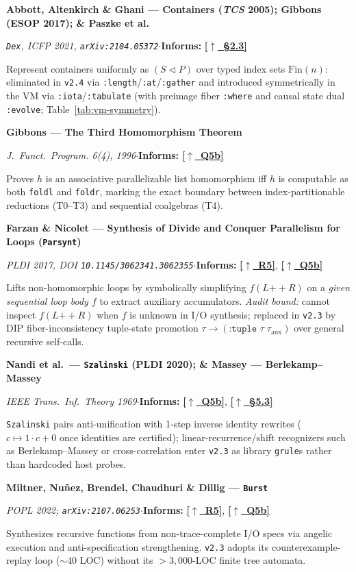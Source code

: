 \documentclass[12pt]{article}
\newcommand{\secback}[2]{\hyperref[#1]{\textcolor{linkblue}{\textbf{\small[\(\uparrow\)~#2]}}}}
\newcommand{\litentry}[4]{%
  \par\medskip\noindent\hypertarget{lit:#1}{}%
  \textbf{#2}\par\nopagebreak\noindent
  {\footnotesize\textit{#3}\quad$\cdot$\quad\textbf{Informs:} #4}\par\nopagebreak\smallskip\noindent\ignorespaces
}
\begin{document}
\litentry{abbott2005}{Abbott, Altenkirch \& Ghani --- Containers (\emph{TCS} 2005); \hypertarget{lit:gibbons2017}{}Gibbons (ESOP 2017); \& \hypertarget{lit:paszke2021}{}Paszke et al.}{\texttt{Dex}, ICFP 2021, \texttt{arXiv:2104.05372}}{\secback{sec:audit-index}{\S2.3}}
Represent containers uniformly as $(S \triangleleft P)$ over typed index sets $\mathrm{Fin}(n)$: eliminated in \texttt{v2.4} via \texttt{:length}/\texttt{:at}/\texttt{:gather} and introduced symmetrically in the VM via \texttt{:iota}/\texttt{:tabulate} (with preimage fiber \texttt{:where} and causal state dual \texttt{:evolve}; Table~\ref{tab:vm-symmetry}).

\litentry{gibbons1996}{Gibbons --- The Third Homomorphism Theorem}{\emph{J.\ Funct.\ Program.} 6(4), 1996}{\secback{ans:5b}{Q5b}}
Proves $h$ is an associative parallelizable list homomorphism iff $h$ is computable as both \texttt{foldl} and \texttt{foldr}, marking the exact boundary between index-partitionable reductions (T0--T3) and sequential coalgebras (T4).

\litentry{farzan2017}{Farzan \& Nicolet --- Synthesis of Divide and Conquer Parallelism for Loops (\texttt{Parsynt})}{PLDI 2017, DOI \texttt{10.1145/3062341.3062355}}{\secback{sec:thesis}{R5}, \secback{ans:5b}{Q5b}}
Lifts non-homomorphic loops by symbolically simplifying $f(L \mathbin{+\!\!+} R)$ on a \emph{given sequential loop body $f$} to extract auxiliary accumulators. \emph{Audit bound:} cannot inspect $f(L\mathbin{+\!\!+}R)$ when $f$ is unknown in I/O synthesis; replaced in \texttt{v2.3} by DIP fiber-inconsistency tuple-state promotion $\tau \to (\texttt{:tuple }\tau\;\tau_{\mathrm{aux}})$ over general recursive self-calls.

\litentry{nandi2020}{Nandi et al.\ --- \texttt{Szalinski} (PLDI 2020); \& \hypertarget{lit:berlekamp1969}{}Massey --- Berlekamp--Massey}{IEEE Trans.\ Inf.\ Theory 1969}{\secback{ans:5b}{Q5b}, \secback{sec:arch-geom}{\S5.3}}
\texttt{Szalinski} pairs anti-unification with 1-step inverse identity rewrites ($c \mapsto 1\cdot c + 0$ once identities are certified); linear-recurrence/shift recognizers such as Berlekamp--Massey or cross-correlation enter \texttt{v2.3} as library \texttt{grule}s rather than hardcoded host probes.

\litentry{miltner2022}{Miltner, Nu\~nez, Brendel, Chaudhuri \& Dillig --- \texttt{Burst}}{POPL 2022; \texttt{arXiv:2107.06253}}{\secback{sec:thesis}{R5}, \secback{ans:5b}{Q5b}}
Synthesizes recursive functions from non-trace-complete I/O specs via angelic execution and anti-specification strengthening. \texttt{v2.3} adopts its counterexample-replay loop ($\sim 40$ LOC) without its $>3,000$-LOC finite tree automata.
\end{document}
